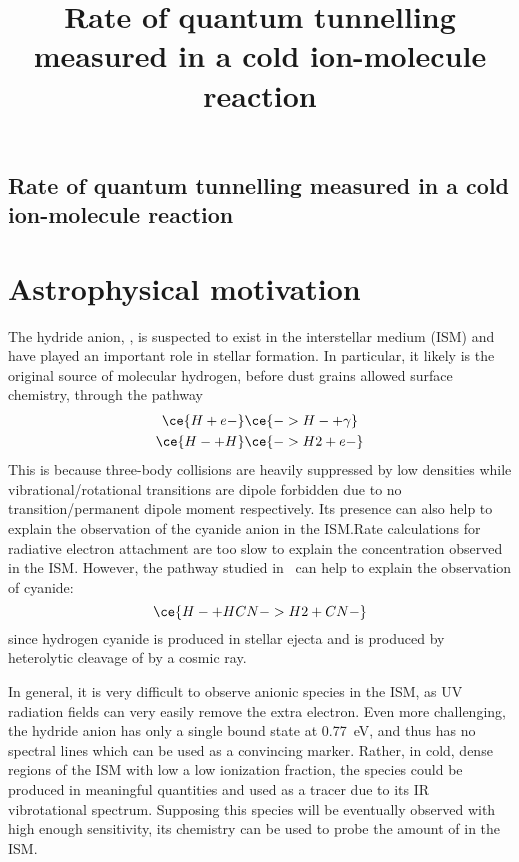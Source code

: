 \documentclass[12pt]{article}
\title{Rate of quantum tunnelling measured in a cold ion-molecule reaction}
\begin{document}
\subsection*{Rate of quantum tunnelling measured in a cold ion-molecule reaction}
\section{Astrophysical motivation}
The hydride anion, , is suspected to exist in the interstellar medium (ISM) and have played an important role in stellar formation. In particular, it likely is the original source of molecular hydrogen, before dust grains allowed surface chemistry, through the pathway\cite{peebles_origin_1968}
\begin{subequations}
    \begin{align}
        \ce{H + e-}&\ce{-> H- + \gamma}\\
        \ce{H- + H}&\ce{-> H2 + e-}
    \end{align}
\end{subequations}
This is because three-body collisions are heavily suppressed by low densities while vibrational/rotational transitions are dipole forbidden due to no transition/permanent dipole moment respectively\cite{krumholz_notes_2016}.
Its presence can also help to explain the observation of the cyanide anion  in the ISM.\@ Rate calculations for radiative electron attachment are too slow to explain the concentration observed in the ISM\cite{douguet_theory_2013}.
However, the pathway studied in~\cite{satta_quantum_2015} can help to explain the observation of cyanide:
\begin{equation}
    \ce{H- + HCN -> H2 + CN-}
\end{equation}
since hydrogen cyanide is produced in stellar ejecta\cite{tielens_molecular_2013} and  is produced by heterolytic cleavage of  by a cosmic ray\cite{satta_quantum_2015}.

In general, it is very difficult to observe anionic species in the ISM, as UV radiation fields can very easily remove the extra electron. Even more challenging, the hydride anion has only a single bound state at \SI{0.77}{eV}, and thus has no spectral lines which can be used as a convincing marker. Rather, in cold, dense regions of the ISM with low a low ionization fraction, the species  could be produced in meaningful quantities and used as a tracer\cite{ayouz_formation_2011} due to its IR vibrotational spectrum. Supposing this species will be eventually observed with high enough sensitivity, its chemistry can be used to probe the amount of  in the ISM.\@
\end{document}
